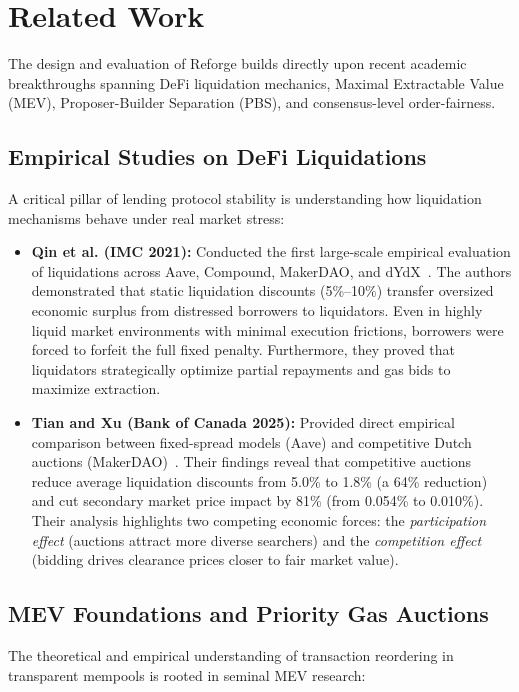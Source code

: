 \chapter{Related Work}
\label{chap:related_work}

The design and evaluation of Reforge builds directly upon recent academic breakthroughs spanning DeFi liquidation mechanics, Maximal Extractable Value (MEV), Proposer-Builder Separation (PBS), and consensus-level order-fairness.

\section{Empirical Studies on DeFi Liquidations}
A critical pillar of lending protocol stability is understanding how liquidation mechanisms behave under real market stress:

\begin{itemize}
    \item \textbf{Qin et al. (IMC 2021):} Conducted the first large-scale empirical evaluation of liquidations across Aave, Compound, MakerDAO, and dYdX~\cite{qin2021empirical}. The authors demonstrated that static liquidation discounts (5\%--10\%) transfer oversized economic surplus from distressed borrowers to liquidators. Even in highly liquid market environments with minimal execution frictions, borrowers were forced to forfeit the full fixed penalty. Furthermore, they proved that liquidators strategically optimize partial repayments and gas bids to maximize extraction.
    
    \item \textbf{Tian and Xu (Bank of Canada 2025):} Provided direct empirical comparison between fixed-spread models (Aave) and competitive Dutch auctions (MakerDAO)~\cite{tian2025liquidation}. Their findings reveal that competitive auctions reduce average liquidation discounts from 5.0\% to 1.8\% (a 64\% reduction) and cut secondary market price impact by 81\% (from 0.054\% to 0.010\%). Their analysis highlights two competing economic forces: the \textit{participation effect} (auctions attract more diverse searchers) and the \textit{competition effect} (bidding drives clearance prices closer to fair market value).
\end{itemize}

\section{MEV Foundations and Priority Gas Auctions}
The theoretical and empirical understanding of transaction reordering in transparent mempools is rooted in seminal MEV research:

